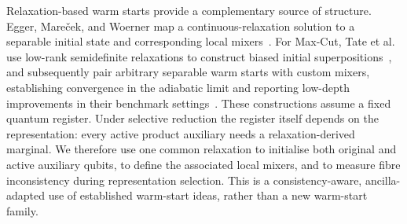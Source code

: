 \documentclass[a4paper,onecolumn,11pt,unpublished]{quantumarticle}
\theoremstyle{remark}
\begin{document}
Relaxation-based warm starts provide a complementary source of structure.
Egger, Mare\v{c}ek, and Woerner map a continuous-relaxation solution to a
separable initial state and corresponding local mixers~\cite{Egger2021}.
For Max-Cut, Tate et al. use low-rank semidefinite relaxations to construct
biased initial superpositions~\cite{TateSDP2023}, and subsequently pair
arbitrary separable warm starts with custom mixers, establishing convergence in
the adiabatic limit and reporting low-depth improvements in their benchmark
settings~\cite{TateCustom2023}.  These constructions assume a fixed quantum
register.  Under selective reduction the register itself depends on the
representation: every active product auxiliary needs a relaxation-derived
marginal.  We therefore use one common relaxation to initialise both original
and active auxiliary qubits, to define the associated local mixers, and to
measure fibre inconsistency during representation selection.  This is a
consistency-aware, ancilla-adapted use of established warm-start ideas, rather
than a new warm-start family.
\end{document}
